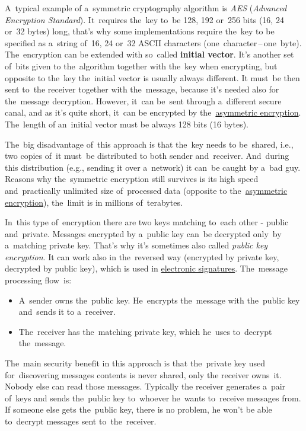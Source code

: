 A~typical example of a~symmetric cryptography algorithm is \textit{AES} (\textit{Advanced Encryption Standard}). It~requires the~key to~be 128, 192 or~256 bits (16, 24 or~32 bytes) long, that's why some implementations require the~key to be specified as a~string of~16, 24 or~32 ASCII characters (one~character\,--\,one~byte). The~encryption can be extended with so~called \textbf{initial vector}. It's another set of~bits given to the~algorithm together with the~key when encrypting, but opposite to the~key the~initial vector is usually always different. It must~be then sent to~the receiver together with the~message, because it's needed also for the~message decryption. However, it~can be~sent through a~different secure canal, and as it's quite short, it~can be encrypted by the~\hyperref[asymmetricencryption]{asymmetric encryption}. The~length of an~initial vector must be always 128 bits (16 bytes).

The~big disadvantage of~this approach is that the~key needs to be~shared, i.e., two copies of~it must~be distributed to both sender and~receiver. And~during this distribution (e.g., sending it over a~network) it can~be caught by a~bad guy. Reasons why the~symmetric encryption still survives is its high speed and~practically unlimited size of~processed data (opposite to the~\hyperref[asymmetricencryption]{asymmetric encryption}), the~limit is in millions of~\mbox{terabytes}.

\label{asymmetricencryption}
In~this type of~encryption there are two keys matching to~each other - public and~private. Messages encrypted by a~public key can~be decrypted only~by a~matching private key. That's why it's sometimes also called \textit{public key encryption}. It can work also in the~reversed way (encrypted by private key, decrypted by public key), which is used in \hyperref[electronicsignature]{electronic signatures}. The~message processing flow~is:
\begin{itemize}
    \item A~sender owns the~public key. He~encrypts the~message with the~public key and~sends it to a~receiver.
    \item The~receiver has the~matching private key, which he~uses to~decrypt the~message.
\end{itemize}

\noindent The~main security benefit in this approach is that the~private key used for~discovering messages contents is never shared, only the receiver owns~it. Nobody else can read those messages. Typically the receiver generates a~pair of~keys and sends the~public key to~whoever he~wants to~receive messages from. If someone else gets the~public key, there is no problem, he won't be able to~decrypt messages sent to~the~receiver.

